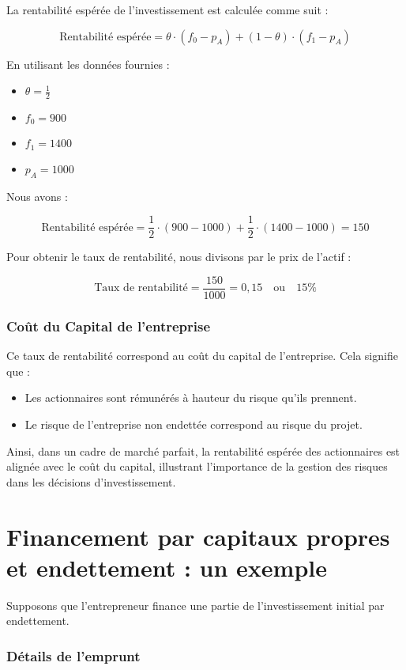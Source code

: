 \documentclass[a4paper, 12pt]{report}
\begin{document}
La rentabilité espérée de l'investissement est calculée comme suit :

\[
\text{Rentabilité espérée} = \theta \cdot (f_0 - p_A) + (1 - \theta) \cdot (f_1 - p_A)
\]

En utilisant les données fournies :

\begin{itemize}
	\item \( \theta = \frac{1}{2} \)
	\item \( f_0 = 900 \)
	\item \( f_1 = 1400 \)
	\item \( p_A = 1000 \)
\end{itemize}

Nous avons :

\[
\text{Rentabilité espérée} = \frac{1}{2} \cdot (900 - 1000) + \frac{1}{2} \cdot (1400 - 1000) = 150
\]

Pour obtenir le taux de rentabilité, nous divisons par le prix de l'actif :

\[
\text{Taux de rentabilité} = \frac{150}{1000} = 0,15 \quad \text{ou} \quad 15\%
\]

\subsubsection{Coût du Capital de l'entreprise}
\noindent
Ce taux de rentabilité correspond au coût du capital de l'entreprise. Cela signifie que :

\begin{itemize}
	\item Les actionnaires sont rémunérés à hauteur du risque qu'ils prennent.
	\item Le risque de l'entreprise non endettée correspond au risque du projet.
\end{itemize}

Ainsi, dans un cadre de marché parfait, la rentabilité espérée des actionnaires est alignée avec le coût du capital, illustrant l'importance de la gestion des risques dans les décisions d'investissement.

\section{Financement par capitaux propres et endettement : un exemple}

Supposons que l'entrepreneur finance une partie de l'investissement initial par endettement. 

\subsubsection{Détails de l'emprunt}
\end{document}
